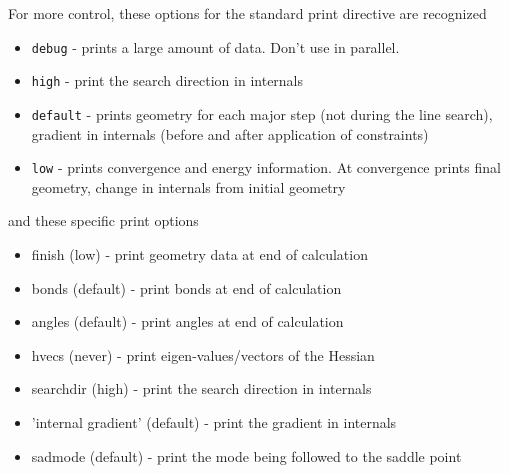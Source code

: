 For more control, these options for the standard print directive are
recognized
\begin{itemize}
\item \verb+debug+   - prints a large amount of data.  Don't use in parallel.
\item \verb+high+    - print the search direction in internals
\item \verb+default+ - prints geometry for each major step (not during
                the line search), gradient in internals (before
                and after application of constraints)
\item \verb+low+     - prints convergence and energy information.  At 
                convergence prints final geometry, change in internals
                from initial geometry
\end{itemize}
and these specific print options
\begin{itemize}
\item      finish (low)      - print geometry data at end of calculation
\item      bonds  (default)  - print bonds at end of calculation
\item      angles (default)  - print angles at end of calculation
\item      hvecs  (never)    - print eigen-values/vectors of the Hessian
\item      searchdir (high)  - print the search direction in internals
\item      'internal gradient' (default) - print the gradient in internals
\item      sadmode (default) - print the mode being followed to the saddle point
\end{itemize}

\fussy



